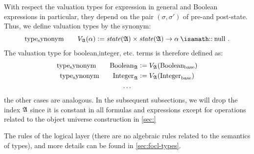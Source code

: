With respect the valuation types for \OCL expression in general and Boolean expressions in
particular, they depend on the pair $(\sigma, \sigma')$ of pre-and post-state.  
Thus, we define valuation types by the synonym:
\begin{equation}
\typesynonym \qquad  \V{\isaAA}{\alpha} \defeq \state{\isaAA} \times \state{\isaAA} \to \alpha \ofType \TCnull \mi{.}
\end{equation}
The valuation type for boolean,integer, etc. \OCL terms is therefore defined as:
\begin{gather*}
\mathrm{type_synonym} \qquad \text{Boolean}_{\mathfrak{A}} \mathrel{\mathop:}=  V_{\mathfrak{A}}({\text{Boolean}_{\text{base}}}) \\
\mathrm{type_synonym} \qquad \text{Integer}_{\mathfrak{A}} \mathrel{\mathop:}=  V_{\mathfrak{A}}({\text{Integer}_{\text{base}}}) \\
\ldots \\
\end{gather*}
the other cases are analogous. In the subsequent subsections, we will drop the index $\mathfrak{A}$ since
it is constant in all formulas and expressions except for operations related to the object universe
construction in \autoref{sec:}

The rules of the logical layer (there are no algebraic rules related to the semantics of types),
and more details can be found in  \autoref{sec:focl-types}.

